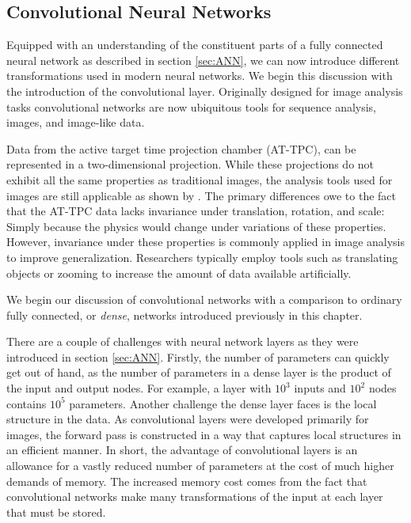 \subsection{Convolutional Neural Networks}\label{sec:cnn}

Equipped with an understanding of the constituent parts of a fully connected neural network as described in section \ref{sec:ANN}, we can now introduce different transformations used in modern neural networks. We begin this discussion with the introduction of the convolutional layer. Originally designed for image analysis tasks convolutional networks are now ubiquitous tools for sequence analysis, images, and image-like data. 

Data from the active target time projection chamber (AT-TPC), can be represented in a two-dimensional projection. While these projections do not exhibit all the same properties as traditional images, the analysis tools used for images are still applicable as shown by \citet{Kuchera2019}. The primary differences owe to the fact that the AT-TPC data lacks invariance under translation, rotation, and scale: Simply because the physics would change under variations of these properties. However, invariance under these properties is commonly applied in image analysis to improve generalization. Researchers typically employ tools such as translating objects or zooming to increase the amount of data available artificially.

We begin our discussion of convolutional networks with a comparison to ordinary fully connected, or \textit{dense}, networks introduced previously in this chapter.

There are a couple of challenges with neural network layers as they were introduced in section \ref{sec:ANN}. Firstly, the number of parameters can quickly get out of hand, as the number of parameters in a dense layer is the product of the input and output nodes. For example, a layer with $10^3$ inputs and $10^2$ nodes contains $10^5$ parameters. Another challenge the dense layer faces is the local structure in the data. As convolutional layers were developed primarily for images, the forward pass is constructed in a way that captures local structures in an efficient manner. In short, the advantage of convolutional layers is an allowance for a vastly reduced number of parameters at the cost of much higher demands of memory. The increased memory cost comes from the fact that convolutional networks make many transformations of the input at each layer that must be stored.

